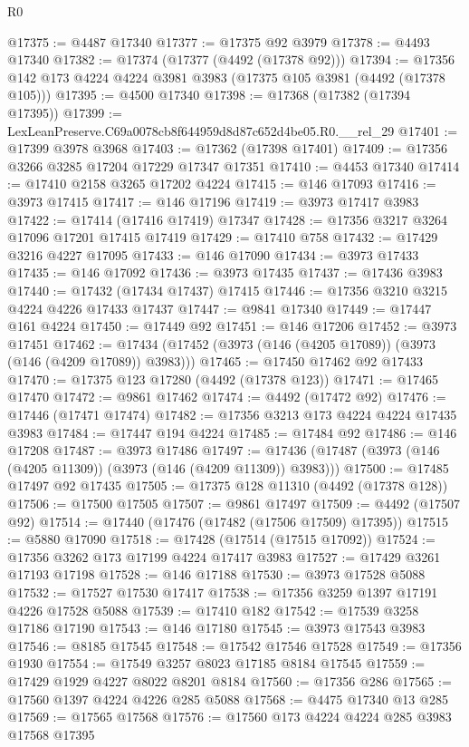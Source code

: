 \begin{lexlean}{R0}
\begin{coremodule}
@17375 := @4487 @17340
@17377 := @17375 @92 @3979
@17378 := @4493 @17340
@17382 := @17374 (@17377 (@4492 (@17378 @92)))
@17394 := @17356 @142 @173 @4224 @4224 @3981 @3983 (@17375 @105 @3981 (@4492 (@17378 @105)))
@17395 := @4500 @17340
@17398 := @17368 (@17382 (@17394 @17395))
@17399 := LexLeanPreserve.C69a0078cb8f644959d8d87c652d4be05.R0.__rel_29
@17401 := @17399 @3978 @3968
@17403 := @17362 (@17398 @17401)
@17409 := @17356 @3266 @3285 @17204 @17229 @17347 @17351
@17410 := @4453 @17340
@17414 := @17410 @2158 @3265 @17202 @4224
@17415 := @146 @17093
@17416 := @3973 @17415
@17417 := @146 @17196
@17419 := @3973 @17417 @3983
@17422 := @17414 (@17416 @17419) @17347
@17428 := @17356 @3217 @3264 @17096 @17201 @17415 @17419
@17429 := @17410 @758
@17432 := @17429 @3216 @4227 @17095
@17433 := @146 @17090
@17434 := @3973 @17433
@17435 := @146 @17092
@17436 := @3973 @17435
@17437 := @17436 @3983
@17440 := @17432 (@17434 @17437) @17415
@17446 := @17356 @3210 @3215 @4224 @4226 @17433 @17437
@17447 := @9841 @17340
@17449 := @17447 @161 @4224
@17450 := @17449 @92
@17451 := @146 @17206
@17452 := @3973 @17451
@17462 := @17434 (@17452 (@3973 (@146 (@4205 @17089)) (@3973 (@146 (@4209 @17089)) @3983)))
@17465 := @17450 @17462 @92 @17433
@17470 := @17375 @123 @17280 (@4492 (@17378 @123))
@17471 := @17465 @17470
@17472 := @9861 @17462
@17474 := @4492 (@17472 @92)
@17476 := @17446 (@17471 @17474)
@17482 := @17356 @3213 @173 @4224 @4224 @17435 @3983
@17484 := @17447 @194 @4224
@17485 := @17484 @92
@17486 := @146 @17208
@17487 := @3973 @17486
@17497 := @17436 (@17487 (@3973 (@146 (@4205 @11309)) (@3973 (@146 (@4209 @11309)) @3983)))
@17500 := @17485 @17497 @92 @17435
@17505 := @17375 @128 @11310 (@4492 (@17378 @128))
@17506 := @17500 @17505
@17507 := @9861 @17497
@17509 := @4492 (@17507 @92)
@17514 := @17440 (@17476 (@17482 (@17506 @17509) @17395))
@17515 := @5880 @17090
@17518 := @17428 (@17514 (@17515 @17092))
@17524 := @17356 @3262 @173 @17199 @4224 @17417 @3983
@17527 := @17429 @3261 @17193 @17198
@17528 := @146 @17188
@17530 := @3973 @17528 @5088
@17532 := @17527 @17530 @17417
@17538 := @17356 @3259 @1397 @17191 @4226 @17528 @5088
@17539 := @17410 @182
@17542 := @17539 @3258 @17186 @17190
@17543 := @146 @17180
@17545 := @3973 @17543 @3983
@17546 := @8185 @17545
@17548 := @17542 @17546 @17528
@17549 := @17356 @1930
@17554 := @17549 @3257 @8023 @17185 @8184 @17545
@17559 := @17429 @1929 @4227 @8022 @8201 @8184
@17560 := @17356 @286
@17565 := @17560 @1397 @4224 @4226 @285 @5088
@17568 := @4475 @17340 @13 @285
@17569 := @17565 @17568
@17576 := @17560 @173 @4224 @4224 @285 @3983 @17568 @17395

\end{coremodule}
\end{lexlean}
